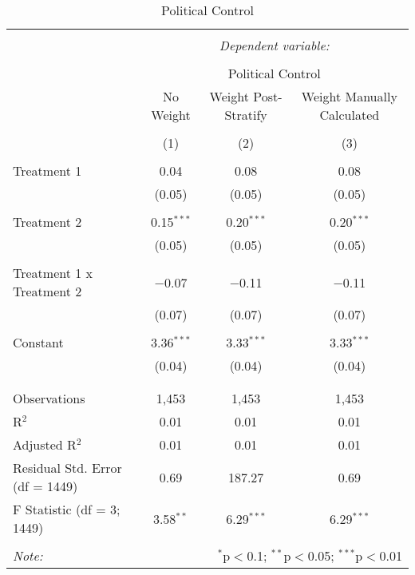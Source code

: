 
\begin{table}[!htbp] \centering 
  \caption{Political Control} 
  \label{} 
\begin{tabular}{@{\extracolsep{5pt}}lccc} 
\\[-1.8ex]\hline 
\hline \\[-1.8ex] 
 & \multicolumn{3}{c}{\textit{Dependent variable:}} \\ 
\cline{2-4} 
\\[-1.8ex] & \multicolumn{3}{c}{Political Control} \\ 
 & No Weight & Weight Post-Stratify & Weight Manually Calculated \\ 
\\[-1.8ex] & (1) & (2) & (3)\\ 
\hline \\[-1.8ex] 
 Treatment 1 & 0.04 & 0.08 & 0.08 \\ 
  & (0.05) & (0.05) & (0.05) \\ 
  & & & \\ 
 Treatment 2 & 0.15$^{***}$ & 0.20$^{***}$ & 0.20$^{***}$ \\ 
  & (0.05) & (0.05) & (0.05) \\ 
  & & & \\ 
 Treatment 1 x Treatment 2 & $-$0.07 & $-$0.11 & $-$0.11 \\ 
  & (0.07) & (0.07) & (0.07) \\ 
  & & & \\ 
 Constant & 3.36$^{***}$ & 3.33$^{***}$ & 3.33$^{***}$ \\ 
  & (0.04) & (0.04) & (0.04) \\ 
  & & & \\ 
\hline \\[-1.8ex] 
Observations & 1,453 & 1,453 & 1,453 \\ 
R$^{2}$ & 0.01 & 0.01 & 0.01 \\ 
Adjusted R$^{2}$ & 0.01 & 0.01 & 0.01 \\ 
Residual Std. Error (df = 1449) & 0.69 & 187.27 & 0.69 \\ 
F Statistic (df = 3; 1449) & 3.58$^{**}$ & 6.29$^{***}$ & 6.29$^{***}$ \\ 
\hline 
\hline \\[-1.8ex] 
\textit{Note:}  & \multicolumn{3}{r}{$^{*}$p$<$0.1; $^{**}$p$<$0.05; $^{***}$p$<$0.01} \\ 
\end{tabular} 
\end{table} 
